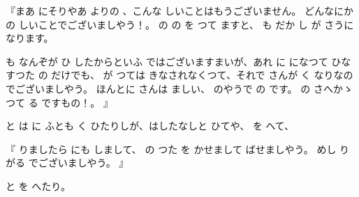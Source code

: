 『まあ
にそりやあ
よりの
、こんな
しいことはもうございません。
どんなにか
の
しいことでございましやう！。
の
の
を
つて
ますと、
も
だか
し
が
さうになります。

も
なんぞが
ひ
したからといふ
ではございますまいが、あれ
に
になつて
ひなすつた
の
だけでも、
が
つては
きなされなくつて、それで
さんが
く
なりなのでございましやう。
ほんとに
さんは
ましい、
のやうで
の
です。
の
さへかゝつて
る
ですもの！。
』

と
は
に
ふとも
く
ひたりしが、はしたなしと
ひてや、
を
へて、

『
りましたら
にも
しまして、
の
つた
を
かせまして
ばせましやう。
めし
り
がる
でございましやう。
』

と
を
へたり。

